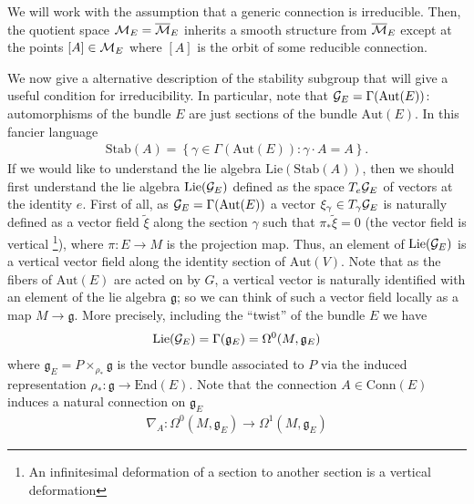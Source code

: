 \documentclass[12pt, onecolumn]{article}
\begin{document}
\noindent We will work with the assumption that a generic connection is irreducible.  Then, the quotient space ${\cal M}_{E}=\overline{{\cal M}}_{E}$ inherits a smooth structure from $\overline{\cal M}_{E}$ except at the points $[A] \in  {\cal M}_{E}$ where $[A]$ is the orbit of some reducible connection.

\vspace{5mm}

\noindent  We now give a alternative description of the stability subgroup that will give a useful condition for irreducibility.  In particular, note that ${\cal G}_{E}=\Gamma(\text{Aut}(E))$: automorphisms of the bundle $E$ are just sections of the bundle $\text{Aut}(E)$. In this fancier language
\begin{align*}
\text{Stab}(A)=\left \{\gamma \in \Gamma(\text{Aut}(E)): \gamma \cdot A = A\right\}.
\end{align*}
If we would like to understand the lie algebra $\text{Lie}(\text{Stab}(A))$, then we should first understand the lie algebra $\text{Lie}({\cal G}_{E})$ defined as the space  $T_{e}{\cal G}_{E}$ of vectors at the identity $e$. First of all, as ${\cal G}_{E} = \Gamma(\text{Aut}(E))$ a vector $\xi_{\gamma} \in T_{\gamma}{\cal G}_{E}$ is naturally defined as a vector field $\tilde{\xi}$ along the section $\gamma$ such that $\pi_{*}\tilde{\xi}=0$ (the vector field is vertical \footnote{An infinitesimal deformation of a section to another section is a vertical deformation}), where $\pi:E \rightarrow M$ is the projection map.  Thus, an element of $\text{Lie}({\cal G}_{E})$ is a vertical vector field along the identity section of $\text{Aut}(V)$.  Note that as the fibers of $\text{Aut}(E)$ are acted on by $G$, a vertical vector is naturally identified with an element of the lie algebra $\mathfrak{g}$; so we can think of such a vector field locally as a map $M \rightarrow \mathfrak{g}$.  More precisely, including the ``twist'' of the bundle $E$ we have
\begin{align*}
\text{Lie}({\cal G}_{E})=\Gamma(\mathfrak{g}_{E})=\Omega^{0}(M,\mathfrak{g}_{E})
\end{align*}
where $\mathfrak{g}_{E}=P \times_{\rho_*} \mathfrak{g}$ is the vector bundle associated to $P$ via the induced representation $\rho_*:\mathfrak{g} \rightarrow \text{End}(E)$.  Note that the connection $A \in \text{Conn}(E)$ induces a natural connection on $\mathfrak{g}_{E}$
\begin{align*}
\nabla_{A}: \Omega^{0}(M,\mathfrak{g}_{E}) \rightarrow \Omega^{1}(M,\mathfrak{g}_{E})
\end{align*}
\end{document}
